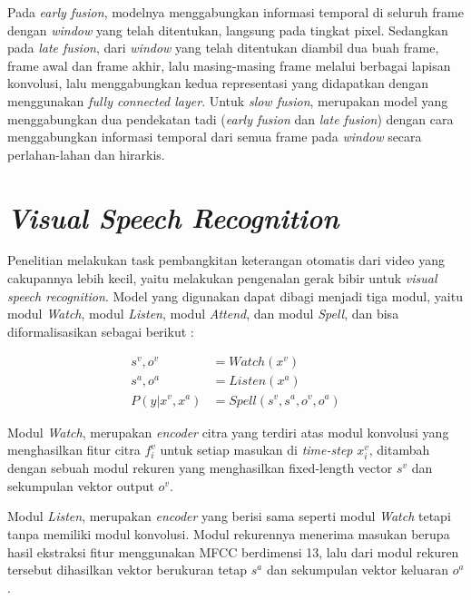 Pada \textit{early fusion}, modelnya menggabungkan informasi temporal di seluruh frame dengan \textit{window} yang telah ditentukan, langsung pada tingkat pixel. Sedangkan pada \textit{late fusion}, dari \textit{window} yang telah ditentukan diambil dua buah frame, frame awal dan frame akhir, lalu masing-masing frame melalui berbagai lapisan konvolusi, lalu menggabungkan kedua representasi yang didapatkan dengan menggunakan \textit{fully connected layer}. Untuk \textit{slow fusion}, merupakan model yang menggabungkan dua pendekatan tadi (\textit{early fusion} dan \textit{late fusion}) dengan cara menggabungkan informasi temporal dari semua frame pada \textit{window} secara perlahan-lahan dan hirarkis.


\section{\textit{Visual Speech Recognition}}

Penelitian \textcite{Chung2017} melakukan task pembangkitan keterangan otomatis dari video yang cakupannya lebih kecil, yaitu melakukan pengenalan gerak bibir untuk \textit{visual speech recognition}. Model yang digunakan dapat dibagi menjadi tiga modul, yaitu modul \textit{Watch}, modul \textit{Listen}, modul \textit{Attend}, dan modul \textit{Spell}, dan bisa diformalisasikan sebagai berikut \parencite{Chung2017}:

\begin{equation*}
    \begin{split}
        s^{v}, o^{v} &= Watch(x^{v}) \\
        s^{a}, o^{a} &= Listen(x^{a}) \\
        P(y|x^{v}, x^{a}) &= Spell(s^{v}, s^{a}, o^{v}, o^{a})
    \end{split}
\end{equation*}

Modul \textit{Watch}, merupakan \textit{encoder} citra yang terdiri atas modul konvolusi yang menghasilkan fitur citra \(f^{v}_{i}\) untuk setiap masukan di \textit{time-step} \(x^{v}_{i}\), ditambah dengan sebuah modul rekuren yang menghasilkan fixed-length vector \(s^{v}\) dan sekumpulan vektor output \(o^{v}\).
\bigskip

Modul \textit{Listen}, merupakan \textit{encoder} yang berisi sama seperti modul \textit{Watch} tetapi tanpa memiliki modul konvolusi. Modul rekurennya menerima masukan berupa hasil ekstraksi fitur menggunakan MFCC berdimensi 13, lalu dari modul rekuren tersebut dihasilkan vektor berukuran tetap \(s^{a}\) dan sekumpulan vektor keluaran \(o^{a}\).
\bigskip

